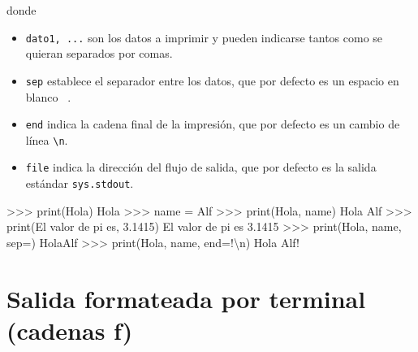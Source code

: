\documentclass[
  spanish,
  a4paper,
]{scrreport}
\newenvironment{Shaded}{\begin{snugshade}}{\end{snugshade}}
\newcommand{\BuiltInTok}[1]{\textcolor[rgb]{0.00,0.23,0.31}{#1}}
\newcommand{\CharTok}[1]{\textcolor[rgb]{0.13,0.47,0.30}{#1}}
\newcommand{\FloatTok}[1]{\textcolor[rgb]{0.68,0.00,0.00}{#1}}
\newcommand{\NormalTok}[1]{\textcolor[rgb]{0.00,0.23,0.31}{#1}}
\newcommand{\OperatorTok}[1]{\textcolor[rgb]{0.37,0.37,0.37}{#1}}
\newcommand{\StringTok}[1]{\textcolor[rgb]{0.13,0.47,0.30}{#1}}
\providecommand{\tightlist}{%
  \setlength{\itemsep}{0pt}\setlength{\parskip}{0pt}}
\begin{document}
donde

\begin{itemize}
\tightlist
\item
  \texttt{dato1,\ ...} son los datos a imprimir y pueden indicarse
  tantos como se quieran separados por comas.
\item
  \texttt{sep} establece el separador entre los datos, que por defecto
  es un espacio en blanco
  \texttt{\textquotesingle{}\ \textquotesingle{}}.
\item
  \texttt{end} indica la cadena final de la impresión, que por defecto
  es un cambio de línea \texttt{\textbackslash{}n}.
\item
  \texttt{file} indica la dirección del flujo de salida, que por defecto
  es la salida estándar \texttt{sys.stdout}.
\end{itemize}

\begin{Shaded}
\begin{Highlighting}[]
\OperatorTok{\textgreater{}\textgreater{}\textgreater{}} \BuiltInTok{print}\NormalTok{(}\StringTok{\textquotesingle{}Hola\textquotesingle{}}\NormalTok{)}
\NormalTok{Hola}
\OperatorTok{\textgreater{}\textgreater{}\textgreater{}}\NormalTok{ name }\OperatorTok{=} \StringTok{\textquotesingle{}Alf\textquotesingle{}}
\OperatorTok{\textgreater{}\textgreater{}\textgreater{}} \BuiltInTok{print}\NormalTok{(}\StringTok{\textquotesingle{}Hola\textquotesingle{}}\NormalTok{, name)}
\NormalTok{Hola Alf}
\OperatorTok{\textgreater{}\textgreater{}\textgreater{}} \BuiltInTok{print}\NormalTok{(}\StringTok{\textquotesingle{}El valor de pi es\textquotesingle{}}\NormalTok{, }\FloatTok{3.1415}\NormalTok{)}
\NormalTok{El valor de pi es }\FloatTok{3.1415}
\OperatorTok{\textgreater{}\textgreater{}\textgreater{}} \BuiltInTok{print}\NormalTok{(}\StringTok{\textquotesingle{}Hola\textquotesingle{}}\NormalTok{, name, sep}\OperatorTok{=}\StringTok{\textquotesingle{}\textquotesingle{}}\NormalTok{)}
\NormalTok{HolaAlf}
\OperatorTok{\textgreater{}\textgreater{}\textgreater{}} \BuiltInTok{print}\NormalTok{(}\StringTok{\textquotesingle{}Hola\textquotesingle{}}\NormalTok{, name, end}\OperatorTok{=}\StringTok{\textquotesingle{}!}\CharTok{\textbackslash{}n}\StringTok{\textquotesingle{}}\NormalTok{)}
\NormalTok{Hola Alf}\OperatorTok{!}
\end{Highlighting}
\end{Shaded}

\section{Salida formateada por terminal (cadenas
f)}\label{salida-formateada-por-terminal-cadenas-f}
\end{document}
